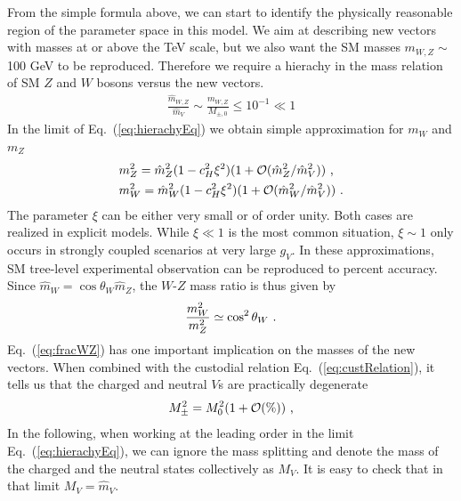 From the simple formula above, we can start to identify the physically reasonable region of the parameter space in this model. We aim at describing new vectors with masses at or above the TeV scale, but we also want the SM masses $m_{W,Z} \sim$ 100 GeV to be reproduced. Therefore we require a hierachy in the mass relation of SM $Z$ and $W$ bosons versus the new vectors.
\begin{align}
  \label{eq:hierachyEq}
  \frac{\hat{m}_{W,Z}}{\hat{m}_{V}}\sim \frac{m_{W,Z}}{M_{\pm ,0}}\leq10^{-1}\ll1
\end{align}
In the limit of Eq.~(\ref{eq:hierachyEq}) we obtain simple approximation for $m_{W}$ and $m_{Z}$
\begin{align}
  &m_{Z}^{2}=\hat{m}_{Z}^{2}(1-c_{H}^{2}\xi^{2})(1+\mathcal{O}(\hat{m}_{Z}^{2}/\hat{m}_{V}^{2}))\textup{ ,}\nonumber\\
  &m_{W}^{2}=\hat{m}_{W}^{2}(1-c_{H}^{2}\xi^{2})(1+\mathcal{O}(\hat{m}_{W}^{2}/\hat{m}_{V}^{2}))\textup{ .}
\end{align}
The parameter $\xi$ can be either very small or of order unity. Both cases are realized in explicit models. While $\xi\ll1$ is the most common situation, $\xi\sim1$ only occurs in strongly coupled scenarios at very large $g_{V}$. In these approximations, SM tree-level experimental observation can be reproduced to percent accuracy.
\newline Since $\hat{m}_{W}=\cos\theta_{W}\hat{m}_{Z}$, the $W$-$Z$ mass ratio is thus given by
\begin{align}
  \label{eq:fracWZ}
  \frac{m_{W}^{2}}{m_{Z}^{2}}\simeq \cos^{2}{\theta_{W}}\textup{ .}
\end{align}
Eq.~(\ref{eq:fracWZ}) has one important implication on the masses of the new vectors. When combined with the custodial relation Eq.~(\ref{eq:custRelation}), it tells us that the charged and neutral $V$s are practically degenerate
\begin{align}
  M_{\pm}^{2}=M_{0}^{2}(1+\mathcal{O}(\%))\textup{ ,}
\end{align}
In the following, when working at the leading order in the limit Eq.~(\ref{eq:hierachyEq}), we can ignore the mass splitting and denote the mass of the charged and the neutral states collectively as $M_{V}$. It is easy to check that in that limit $M_{V} = \hat{m}_{V}$.

